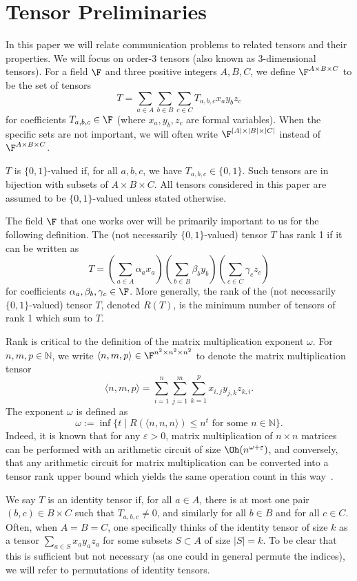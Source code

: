 

\section{Tensor Preliminaries}

In this paper we will relate communication problems to related tensors and their properties. We will focus on order-3 tensors (also known as 3-dimensional tensors). For a field $\F$ and three positive integers $A,B,C$, we define $\F^{A\times B \times C}$ to be the set of tensors $$T = \sum_{a \in A} \sum_{b \in B} \sum_{c \in C} T_{a,b,c} x_a y_b z_c$$ for coefficients $T_{a,b,c} \in \F$ (where $x_a, y_b, z_c$ are formal variables). When the specific sets are not important, we will often write $\F^{|A|\times |B| \times |C|}$ instead of $\F^{A\times B \times C}$.

$T$ is $\{0,1\}$-valued if, for all $a,b,c$, we have $T_{a,b,c} \in \{0,1\}$. Such tensors are in bijection with subsets of $A \times B \times C$. All tensors considered in this paper are assumed to be $\{0,1\}$-valued unless stated otherwise.

The field $\F$ that one works over will be primarily important to us for the following definition. The (not necessarily $\{0,1\}$-valued) tensor $T$ has rank 1 if it can be written as $$T = \left( \sum_{a \in A} \alpha_a x_a \right)\left( \sum_{b \in B} \beta_b y_b \right)\left( \sum_{c \in C} \gamma_c z_c \right)$$ for coefficients $\alpha_a, \beta_b, \gamma_c \in \F$. More generally, the rank of the (not necessarily $\{0,1\}$-valued) tensor $T$, denoted $R(T)$, is the minimum number of tensors of rank 1 which sum to $T$.

Rank is critical to the definition of the matrix multiplication exponent $\omega$. For $n,m,p \in \mathbb{N}$, we write $\langle n,m,p \rangle \in \F^{n^2 \times n^2 \times n^2}$ to denote the matrix multiplication tensor $$\langle n,m,p \rangle = \sum_{i =1}^n \sum_{j=1}^m \sum_{k=1}^p x_{i,j} y_{j,k} z_{k,i}.$$ The exponent $\omega$ is defined as $$\omega := \inf\{ t \mid R(\langle n,n,n \rangle) \leq n^t \text{ for some } n \in \mathbb{N}\}.$$ Indeed, it is known that for any $\varepsilon>0$, matrix multiplication of $n \times n$ matrices can be performed with an arithmetic circuit of size $\Oh(n^{\omega + \varepsilon})$, and conversely, that any arithmetic circuit for matrix multiplication can be converted into a tensor rank upper bound which yields the same operation count in this way~\cite{S73}.


We say $T$ is an identity tensor if, for all $a \in A$, there is at most one pair $(b,c) \in B \times C$ such that $T_{a,b,c} \neq 0$, and similarly for all $b \in B$ and for all $c \in C$. Often, when $A=B=C$, one specifically thinks of the identity tensor of size $k$ as a tensor $\sum_{a \in S} x_a y_a z_a$ for some subsets $S \subset A$ of size $|S|=k$. To be clear that this is sufficient but not necessary (as one could in general permute the indices), we will refer to permutations of identity tensors.


